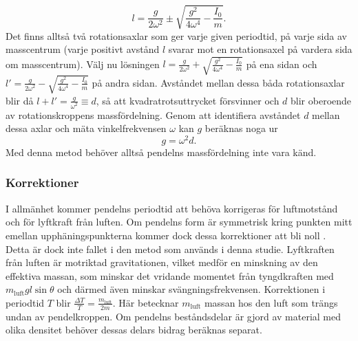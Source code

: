 \documentclass[11pt,a4paper]{article}
\begin{document}
\begin{equation}
l=\frac{g}{2\omega^2}\pm\sqrt{\frac{g^2}{4\omega^4}-\frac{I_0}{m}}.
\label{katerekv}
\end{equation}
Det finns alltså två rotationsaxlar som ger varje given periodtid, på varje sida av masscentrum (varje positivt avstånd $l$ svarar mot en rotationsaxel på vardera sida om masscentrum). Välj nu lösningen $l=\frac{g}{2\omega^2}+\sqrt{\frac{g^2}{4\omega^4}-\frac{I_0}{m}}$ på ena sidan och $l'=\frac{g}{2\omega^2}-\sqrt{\frac{g^2}{4\omega^4}-\frac{I_0}{m}}$ på andra sidan. Avståndet mellan dessa båda rotationsaxlar blir då $l+l'=\frac{g}{\omega^2}\equiv d$, så att kvadratrotsuttrycket försvinner och $d$ blir oberoende av rotationskroppens massfördelning. Genom att identifiera avståndet $d$ mellan dessa axlar och mäta vinkelfrekvensen $\omega$ kan $g$ beräknas noga ur
\[g= \omega^2d.\]
Med denna metod behöver alltså pendelns massfördelning inte vara känd.

\subsubsection{Korrektioner}\label{sec:katerkorr}
I allmänhet kommer pendelns periodtid att behöva korrigeras för luftmotstånd och för lyftkraft från luften. Om pendelns form är symmetrisk kring punkten mitt emellan upphäningspunkterna kommer dock dessa korrektioner att bli noll \cite{kater}. Detta är dock inte fallet i den metod som används i denna studie. Lyftkraften från luften är motriktad gravitationen, vilket medför en minskning av den effektiva massan, som minskar det vridande momentet från tyngdkraften med $m_\mathrm{luft}gl\sin\theta$ och därmed även minskar svängningsfrekvensen. Korrektionen i periodtid $T$ blir $\frac{\Delta T}{T}= \frac{m_\mathrm{luft}}{2m}$. Här betecknar $m_\mathrm{luft}$ massan hos den luft som trängs undan av pendelkroppen. Om pendelns beståndsdelar är gjord av material med olika densitet behöver dessas delars bidrag beräknas separat.
\end{document}
